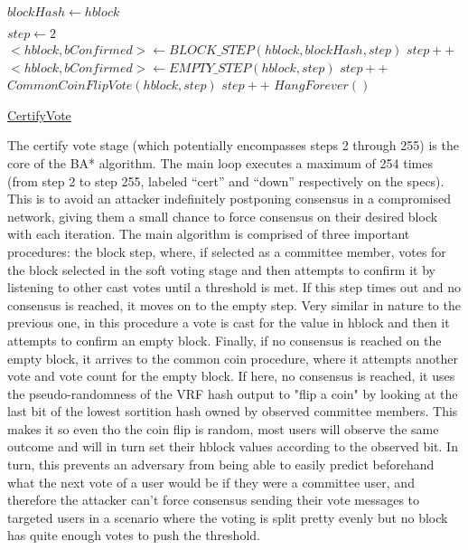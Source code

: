 \documentclass[10pt,a4paper]{article}
\begin{document}
\begin{algorithm}
    \begin{algorithmic}[H]
    \State $blockHash \gets hblock$

    \State $step \gets 2$
        \\
        \State $<hblock, bConfirmed> \gets BLOCK\_STEP(hblock, blockHash, step)$
        \EndIf
        \State $step++$\\
   
        \State $<hblock, bConfirmed> \gets EMPTY\_STEP(hblock,step)$
        \EndIf
        \State $step++$\\

        \State $CommonCoinFlipVote(hblock, step)$
        \State $step++$
    \EndWhile
    \State $HangForever()$
    \EndFunction
    \end{algorithmic}
    \caption{\underline{CertifyVote}}
\end{algorithm}

The certify vote stage (which potentially encompasses steps 2 through 255) is the core of the BA* algorithm.
The main loop executes a maximum of 254 times (from step 2 to step 255, labeled ``cert'' and ``down'' respectively on the specs).
This is to avoid an attacker indefinitely postponing consensus in a compromised network, giving them a small chance to force consensus on their desired block with each iteration.
The main algorithm is comprised of three important procedures: the block step, where, if selected as a committee member, votes for the block selected in the soft voting stage and then attempts to confirm it by listening to other cast votes until a threshold is met.
If this step times out and no consensus is reached, it moves on to the empty step. Very similar in nature to the previous one, in this procedure a vote is cast for the value in hblock and then it attempts to confirm an empty block.
Finally, if no consensus is reached on the empty block, it arrives to the common coin procedure, where it attempts another vote and vote count for the empty block. If here, no consensus is reached, it uses the pseudo-randomness of the VRF hash output to "flip a coin" by looking at the last bit of the lowest sortition hash owned by observed committee members.
This makes it so even tho the coin flip is random, most users will observe the same outcome and will in turn set their hblock values according to the observed bit. In turn, this prevents an adversary from being able to easily predict beforehand what the next vote of a user would be if they were a committee user, and therefore the attacker can't force consensus 
sending their vote messages to targeted users in a scenario where the voting is split pretty evenly but no block has quite enough votes to push the threshold.\\
\end{document}
